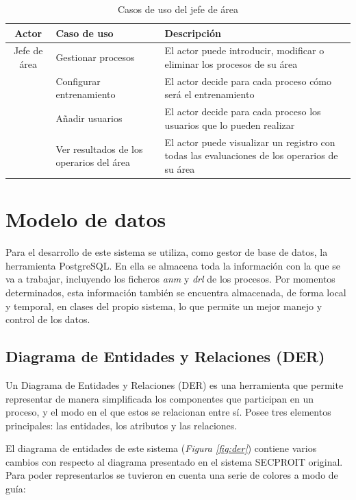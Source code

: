 \begin{table}[H]
\begin{center}
\begin{tabular}{ | c | p{3.5cm} |  p{7.5cm} |}
\hline
\textbf{Actor} & \textbf{Caso de uso} & \textbf{Descripción}\\
\hline
Jefe de área & Gestionar procesos & El actor puede introducir, modificar o eliminar los procesos de su área \\
\cline{2-3}
& Configurar entrenamiento & El actor decide para cada proceso cómo será el entrenamiento \\
\cline{2-3}
& Añadir usuarios & El actor decide para cada proceso los usuarios que lo pueden realizar \\
\cline{2-3}
& Ver resultados de los operarios del área & El actor puede visualizar un registro con todas las evaluaciones de los operarios de su área \\
\hline
\end{tabular}
\caption{Casos de uso del jefe de área}
\end{center}
\end{table}

\section{Modelo de datos}
Para el desarrollo de este sistema se utiliza, como gestor de base de datos, la herramienta PostgreSQL. En ella se almacena toda la información con la que se va a trabajar, incluyendo los ficheros \textsl{anm} y \textsl{drl} de los procesos. Por momentos determinados, esta información también se encuentra almacenada, de forma local y temporal, en clases del propio sistema, lo que permite un mejor manejo y control de los datos.

\subsection{Diagrama de Entidades y Relaciones (DER)}
Un Diagrama de Entidades y Relaciones (DER) es una herramienta que permite representar de manera simplificada los componentes que participan en un proceso, y el modo en el que estos se relacionan entre sí. Posee tres elementos principales: las entidades, los atributos y las relaciones. %

El diagrama de entidades de este sistema (\textsl{Figura \ref{fig:der}}) contiene varios cambios con respecto al diagrama presentado en el sistema SECPROIT original. Para poder representarlos se tuvieron en cuenta una serie de colores a modo de guía:

